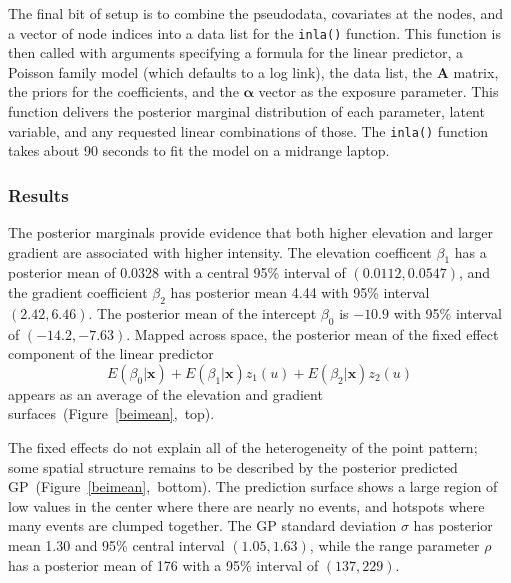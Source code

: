 \documentclass[]{interact}
\begin{document}
The final bit of setup is to combine the pseudodata, covariates at the nodes,
and a vector of node indices into a data list for the \texttt{inla()} function.
This function is then called with arguments specifying a formula for the
linear predictor, a Poisson family model (which defaults to a log link), the
data list, the \(\mathbf{A}\) matrix, the priors for the coefficients, and the
\(\boldsymbol{\alpha}\) vector as the exposure parameter. This function
delivers the posterior marginal distribution of each parameter, latent
variable, and any requested linear combinations of those. The \texttt{inla()}
function takes about 90 seconds to fit the model on a midrange laptop.


\subsubsection{Results}
\label{beiresults}

The posterior marginals provide evidence that both higher elevation and larger
gradient are associated with higher intensity. The elevation coefficent
\(\beta_{1}\) has a posterior mean of 0.0328 with a central 95\% interval of
\((0.0112, 0.0547)\), and the gradient coefficient \(\beta_{2}\) has posterior
mean 4.44 with 95\% interval \((2.42, 6.46)\). The posterior mean of the
intercept \(\beta_{0}\) is \(-10.9\) with 95\% interval of \((-14.2, -7.63)\).
Mapped across space, the posterior mean of the fixed effect component of the
linear predictor
\begin{equation}
E(\beta_{0} | \mathbf{x}) + E(\beta_{1} | \mathbf{x}) z_{1}(u)
+ E(\beta_{2} | \mathbf{x}) z_{2}(u)
\end{equation}
appears as an average of the elevation and gradient
surfaces~(Figure~\ref{beimean},~top).

The fixed effects do not explain all of the heterogeneity of the point pattern;
some spatial structure remains to be described by the posterior predicted
GP~(Figure~\ref{beimean},~bottom). The prediction surface shows a large region
of low values in the center where there are nearly no events, and hotspots
where many events are clumped together. The GP standard deviation \(\sigma\)
has posterior mean 1.30 and 95\% central interval \((1.05, 1.63)\), while the
range parameter \(\rho\) has a posterior mean of 176 with a 95\% interval of
\((137, 229)\).
\end{document}
